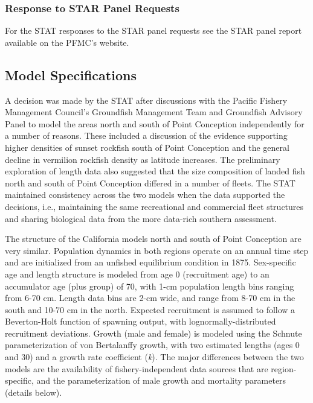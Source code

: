 \documentclass[
  english,
  a4paper,
]{article}
\begin{document}
\hypertarget{response-to-star-panel-requests}{%
\subsubsection{Response to STAR Panel Requests}\label{response-to-star-panel-requests}}

For the STAT responses to the STAR panel requests see the STAR panel report available
on the PFMC's website.

\hypertarget{model-specifications}{%
\subsection{Model Specifications}\label{model-specifications}}

A decision was made by the STAT after discussions with the Pacific Fishery Management Council's Groundfish Management Team and Groundfish Advisory Panel to model the areas north and south of Point Conception independently for a number of reasons. These included a discussion of the evidence supporting higher densities of sunset rockfish south of Point Conception and the general decline in vermilion rockfish density as latitude increases. The preliminary exploration of length data also suggested that the size composition of landed fish north and south of Point Conception differed in a number of fleets. The STAT maintained consistency across the two models when the data supported the decisions, i.e., maintaining the same recreational and commercial fleet structures and sharing biological data from the more data-rich southern assessment.

The structure of the California models north and south of Point Conception are very similar. Population dynamics in both regions operate on an annual time step and are initialized from an unfished equilibrium condition in 1875. Sex-specific age and length structure is modeled from age 0 (recruitment age) to an accumulator age (plus group) of 70, with 1-cm population length bins ranging from 6-70 cm. Length data bins are 2-cm wide, and range from 8-70 cm in the south and 10-70 cm in the north. Expected recruitment is assumed to follow a Beverton-Holt function of spawning output, with lognormally-distributed recruitment deviations. Growth (male and female) is modeled using the Schnute parameterization of von Bertalanffy growth, with two estimated lengths (ages 0 and 30) and a growth rate coefficient (\emph{k}). The major differences between the two models are the availability of fishery-independent data sources that are region-specific, and the parameterization of male growth and mortality parameters (details below).
\end{document}
